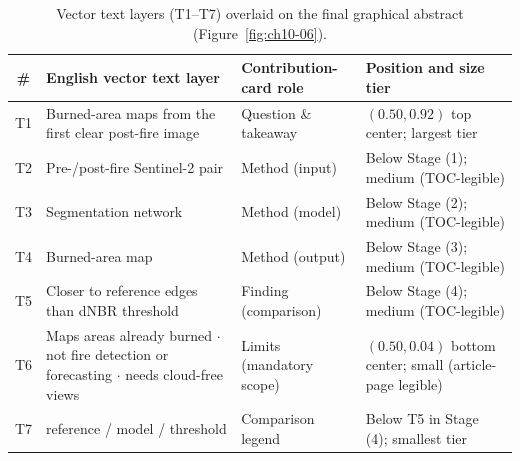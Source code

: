 \begin{table}[htbp]\centering\footnotesize
\setlength{\tabcolsep}{3pt}
\renewcommand{\arraystretch}{1.15}
\caption{Vector text layers (T1--T7) overlaid on the final graphical abstract (Figure~\ref{fig:ch10-06}).}\label{tab:ch10-06-text}
\begin{tabularx}{\linewidth}{@{}cY>{\raggedright\arraybackslash}p{30mm}>{\raggedright\arraybackslash}p{32mm}@{}}
\toprule
\textbf{\#} & \textbf{English vector text layer} & \textbf{Contribution-card role} & \textbf{Position and size tier} \\
\midrule
T1 & Burned-area maps from the first clear post-fire image & Question \& takeaway & $(0.50,0.92)$ top center; largest tier \\
T2 & Pre-/post-fire Sentinel-2 pair & Method (input) & Below Stage (1); medium (TOC-legible) \\
T3 & Segmentation network & Method (model) & Below Stage (2); medium (TOC-legible) \\
T4 & Burned-area map & Method (output) & Below Stage (3); medium (TOC-legible) \\
T5 & Closer to reference edges than dNBR threshold & Finding (comparison) & Below Stage (4); medium (TOC-legible) \\
T6 & Maps areas already burned $\cdot$ not fire detection or forecasting $\cdot$ needs cloud-free views & Limits (mandatory scope) & $(0.50,0.04)$ bottom center; small (article-page legible) \\
T7 & reference / model / threshold & Comparison legend & Below T5 in Stage (4); smallest tier \\
\bottomrule
\end{tabularx}
\end{table}

